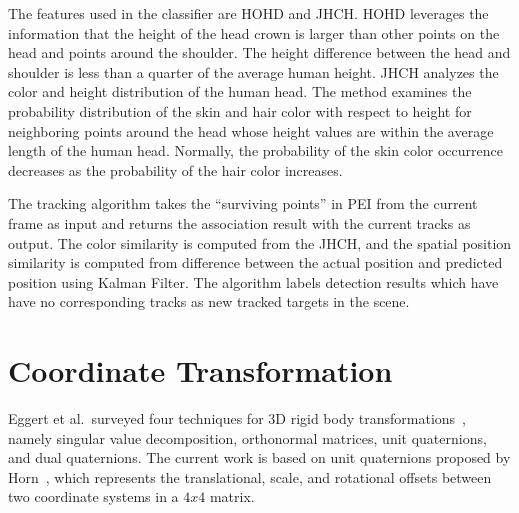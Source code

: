 The features used in the classifier are HOHD and JHCH. HOHD leverages the information that the height of the head crown is larger than other points on the head and points around the shoulder. The height difference between the head and shoulder is less than a quarter of the average human height. JHCH analyzes the color and height distribution of the human head. The method examines the probability distribution of the skin and hair color with respect to height for neighboring points around the head whose height values are within the average length of the human head. Normally, the probability of the skin color occurrence decreases as the probability of the hair color increases.

The tracking algorithm takes the ``surviving points'' in PEI from the current frame as input and returns the association result with the current tracks as output. The color similarity is computed from the JHCH, and the spatial position similarity is computed from difference between the actual position and predicted position using Kalman Filter. The algorithm labels detection results which have have no corresponding tracks as new tracked targets in the scene.



\section{Coordinate Transformation}

Eggert et al.\ surveyed four techniques for 3D rigid body transformations~\cite{eggert_four_algorithms}, namely singular value decomposition, orthonormal matrices, unit quaternions, and dual quaternions. The current work is based on unit quaternions proposed by Horn~\cite{horn_unit_quaternions}, which represents the translational, scale, and rotational offsets between two coordinate systems in a $4x4$ matrix.

